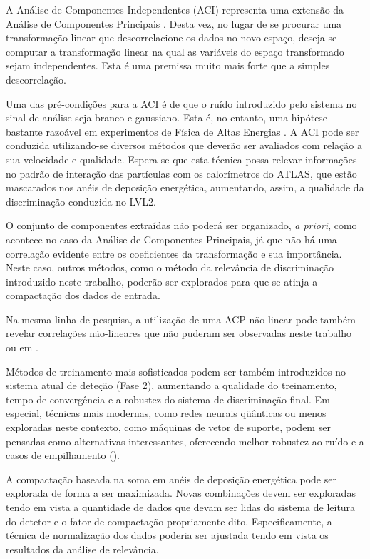A Análise de Componentes Independentes (ACI) representa uma extensão da
Análise de Componentes Principais \cite{oja-ica}. Desta vez, no lugar de se
procurar uma transformação linear que descorrelacione os dados no novo espaço,
deseja-se computar a transformação linear na qual as variáveis do espaço
transformado sejam independentes. Esta é uma premissa muito mais forte que
a simples descorrelação.

Uma das pré-condições para a ACI é de que o ruído introduzido pelo sistema no
sinal de análise seja branco e gaussiano. Esta é, no entanto, uma hipótese
bastante razoável em experimentos de Física de Altas Energias \cite{knoll,
leo}. A ACI pode ser conduzida utilizando-se diversos métodos que deverão ser
avaliados com relação a sua velocidade e qualidade. Espera-se que esta técnica
possa relevar informações no padrão de interação das partículas com os
calorímetros do ATLAS, que estão mascarados nos anéis de deposição energética,
aumentando, assim, a qualidade da discriminação conduzida no LVL2.

O conjunto de componentes extraídas não poderá ser organizado, \textit{a
priori}, como acontece no caso da Análise de Componentes Principais, já que
não há uma correlação evidente entre os coeficientes da transformação e sua
importância. Neste caso, outros métodos, como o método da relevância de
discriminação introduzido neste trabalho, poderão ser explorados para que se
atinja a compactação dos dados de entrada.

Na mesma linha de pesquisa, a utilização de uma ACP não-linear pode também
revelar correlações não-lineares que não puderam ser observadas neste trabalho
ou em \cite{herman}.

Métodos de treinamento mais sofisticados podem ser também introduzidos no
sistema atual de deteção (Fase 2), aumentando a qualidade do treinamento,
tempo de convergência e a robustez do sistema de discriminação final. Em
especial, técnicas mais modernas, como redes neurais qüânticas \cite{qnns} ou
menos exploradas neste contexto, como máquinas de vetor de suporte,
\cite{haykin} podem ser pensadas como alternativas interessantes, oferecendo
melhor robustez ao ruído e a casos de empilhamento ().

A compactação baseada na soma em anéis de deposição energética pode ser
explorada de forma a ser maximizada. Novas combinações devem ser exploradas
tendo em vista a quantidade de dados que devam ser lidas do sistema de
leitura do detetor e o fator de compactação propriamente dito. Especificamente,
a técnica de normalização dos dados poderia ser ajustada tendo em vista os
resultados da análise de relevância.

